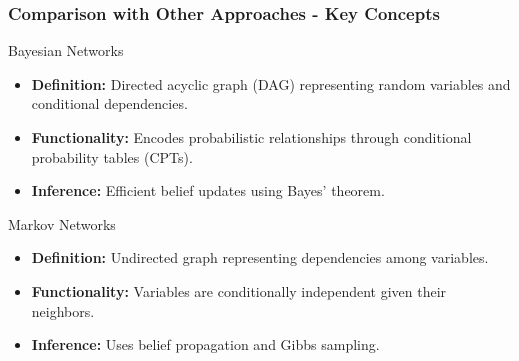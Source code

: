 \documentclass[aspectratio=169]{beamer}
\begin{document}
\begin{frame}[fragile]
    \frametitle{Comparison with Other Approaches - Key Concepts}
    
    \begin{block}{Bayesian Networks}
        \begin{itemize}
            \item \textbf{Definition:} Directed acyclic graph (DAG) representing random variables and conditional dependencies.
            \item \textbf{Functionality:} Encodes probabilistic relationships through conditional probability tables (CPTs).
            \item \textbf{Inference:} Efficient belief updates using Bayes' theorem.
        \end{itemize}
    \end{block}

    \begin{block}{Markov Networks}
        \begin{itemize}
            \item \textbf{Definition:} Undirected graph representing dependencies among variables.
            \item \textbf{Functionality:} Variables are conditionally independent given their neighbors.
            \item \textbf{Inference:} Uses belief propagation and Gibbs sampling.
        \end{itemize}
    \end{block}
\end{frame}
\end{document}
